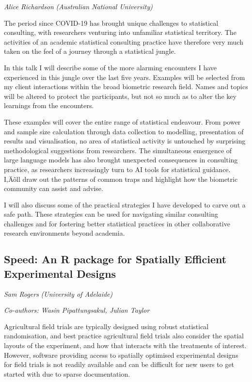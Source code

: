 \documentclass[
]{scrreprt}
\begin{document}
\emph{Alice Richardson} \emph{(Australian
National University)}

\setlength{\parskip}{0.5em}

The period since COVID-19 has brought unique challenges to statistical
consulting, with researchers venturing into unfamiliar statistical
territory. The activities of an academic statistical consulting practice
have therefore very much taken on the feel of a journey through a
statistical jungle.

In this talk I will describe some of the more alarming encounters I have
experienced in this jungle over the last five years. Examples will be
selected from my client interactions within the broad biometric research
field. Names and topics will be altered to protect the participants, but
not so much as to alter the key learnings from the encounters.

These examples will cover the entire range of statistical endeavour.
From power and sample size calculation through data collection to
modelling, presentation of results and visualisation, no area of
statistical activity is untouched by surprising methodological
suggestions from researchers. The simultaneous emergence of large
language models has also brought unexpected consequences in consulting
practice, as researchers increasingly turn to AI tools for statistical
guidance. I‚Äôll draw out the patterns of common traps and highlight how
the biometric community can assist and advise.

I will also discuss some of the practical strategies I have developed to
carve out a safe path. These strategies can be used for navigating
similar consulting challenges and for fostering better statistical
practices in other collaborative research environments beyond academia.

\subsection{Speed: An R package for Spatially Efficient Experimental
Designs}\label{speed-an-r-package-for-spatially-efficient-experimental-designs}

\emph{Sam Rogers} \emph{(University of Adelaide)}

\emph{Co-authors: Wasin Pipattungsakul, Julian Taylor}

\setlength{\parskip}{0.5em}

Agricultural field trials are typically designed using robust
statistical randomisation, and best practice agricultural field trials
also consider the spatial layouts of the experiment, and how that
interacts with the treatments of interest. However, software providing
access to spatially optimised experimental designs for field trials is
not readily available and can be difficult for new users to get started
with due to sparse documentation.
\end{document}
